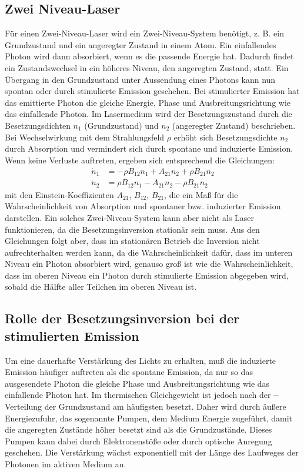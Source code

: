 \subsection{Zwei Niveau-Laser}
Für einen Zwei-Niveau-Laser wird ein Zwei-Niveau-System benötigt,
z. B. ein Grundzustand und ein angeregter Zustand in einem Atom.  Ein
einfallendes Photon wird dann absorbiert, wenn es die passende 
Energie hat.
Dadurch findet ein Zustandswechsel in ein höheres Niveau, den angeregten
Zustand, statt.  Ein Übergang in den Grundzustand unter Aussendung eines
Photons kann nun spontan oder durch stimulierte Emission geschehen.  Bei
stimulierter Emission hat das emittierte Photon die gleiche Energie,
Phase und Ausbreitungsrichtung wie das einfallende Photon. Im
Lasermedium wird der Besetzungszustand durch die Besetzungsdichten $n_1$
(Grundzustand) und $n_2$ (angeregter Zustand) beschrieben.  Bei
Wechselwirkung mit dem Strahlungsfeld $\rho$ erhöht sich 
Besetzungsdichte 
$n_2$ durch Absorption und vermindert sich durch spontane und induzierte
Emission.  Wenn keine Verluste auftreten, ergeben sich entsprechend die
Gleichungen:
\begin{align}
  \dot{n}_1 &= -\rho B_{12} n_1 + A_{21} n_2 + \rho B_{21} n_2\\
  \dot{n}_2 &=  \rho B_{12} n_1 - A_{21} n_2 - \rho B_{21} n_2
\end{align}
mit den Einstein-Koeffizienten $A_{21}$, $B_{12}$, $B_{21}$, die ein Maß
für die Wahrscheinlichkeit von Absorption und spontaner bzw. induzierter
Emission darstellen.  Ein solches Zwei-Niveau-System kann aber nicht als
Laser funktionieren, da die Besetzungsinversion stationär sein muss.  
Aus
den Gleichungen folgt aber, dass im stationären Betrieb die Inversion
nicht aufrechterhalten werden kann, da die Wahrscheinlichkeit dafür, dass
im unteren Niveau ein Photon absorbiert wird, genauso groß ist wie die
Wahrscheinlichkeit, dass im oberen Niveau ein Photon durch stimulierte
Emission abgegeben wird, sobald die Hälfte aller Teilchen im oberen
Niveau ist.

\subsection{Rolle der Besetzungsinversion bei der stimulierten Emission}
Um eine dauerhafte Verstärkung des Lichts zu erhalten, muß die
induzierte Emission häufiger auftreten als die spontane Emission, da nur
so das ausgesendete Photon die gleiche Phase und Ausbreitungsrichtung
wie das einfallende Photon hat.  Im thermischen Gleichgewicht ist jedoch
nach der --Verteilung der Grundzustand am
häufigsten besetzt.  Daher wird durch äußere Energiezufuhr, das
sogenannte Pumpen, dem Medium Energie zugeführt, damit die angeregten
Zustände höher besetzt sind als die Grundzustände.  Dieses Pumpen kann dabei
durch Elektronenstöße oder durch optische Anregung geschehen.  Die Verstärkung
wächst exponentiell mit der Länge des Laufweges der Photonen im 
aktiven Medium an.

